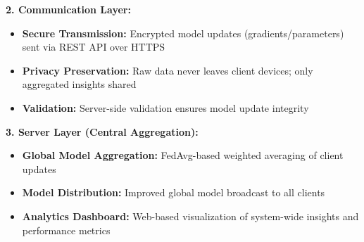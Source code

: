 \documentclass[11pt, a4paper]{article}
\begin{document}
\textbf{2. Communication Layer:}
\begin{itemize}[noitemsep, topsep=0pt]
    \item \textbf{Secure Transmission:} Encrypted model updates (gradients/parameters) sent via REST API over HTTPS
    \item \textbf{Privacy Preservation:} Raw data never leaves client devices; only aggregated insights shared
    \item \textbf{Validation:} Server-side validation ensures model update integrity
\end{itemize}

\textbf{3. Server Layer (Central Aggregation):}
\begin{itemize}[noitemsep, topsep=0pt]
    \item \textbf{Global Model Aggregation:} FedAvg-based weighted averaging of client updates
    \item \textbf{Model Distribution:} Improved global model broadcast to all clients
    \item \textbf{Analytics Dashboard:} Web-based visualization of system-wide insights and performance metrics
\end{itemize}
\end{document}
